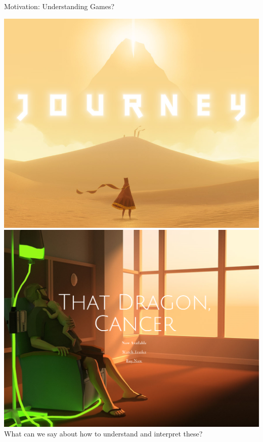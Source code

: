 \documentclass[xcolor=x11names]{beamer}
\begin{document}
\begin{frame}{Motivation: Understanding Games?}
\begin{center}
  \includegraphics[height=0.45\textheight]{res/journey-title.png}
  \hspace*{1em}
  \includegraphics[height=0.45\textheight]{res/that-dragon-cancer.png}
  \vspace{1em}
  What can we say about how to understand and interpret these?
\end{center}
\end{frame}
\end{document}
